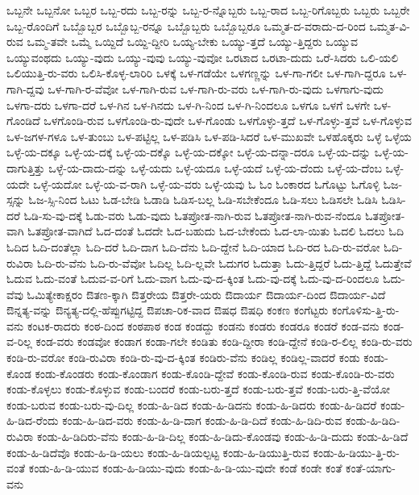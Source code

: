 {ಒಬ್ಬನೇ
ಒಬ್ಬನೋ
ಒಬ್ಬರ
ಒಬ್ಬ-ರದು
ಒಬ್ಬ-ರನ್ನು
ಒಬ್ಬ-ರ-ನ್ನೊಬ್ಬರು
ಒಬ್ಬ-ರಾದ
ಒಬ್ಬ-ರಿಗೊಬ್ಬರು
ಒಬ್ಬರು
ಒಬ್ಬರೇ
ಒಬ್ಬ-ರೊಂದಿಗೆ
ಒಬ್ಬೊಬ್ಬರ
ಒಬ್ಬೊಬ್ಬ-ರನ್ನೂ
ಒಬ್ಬೊಬ್ಬರು
ಒಬ್ಬೊಬ್ಬರೂ
ಒಮ್ಮತ-ದ-ವರಾದು-ದ-ರಿಂದ
ಒಮ್ಮತ-ವಿ-ರುವ
ಒಮ್ಮ-ತವೇ
ಒಮ್ಮೆ
ಒಯ್ದಿದೆ
ಒಯ್ದಿ-ದ್ದೀರಿ
ಒಯ್ಯ-ಬೇಕು
ಒಯ್ಯು-ತ್ತದೆ
ಒಯ್ಯು-ತ್ತಿದ್ದರು
ಒಯ್ಯುವ
ಒಯ್ಯುವಂಥದು
ಒಯ್ಯು-ವುದು
ಒಯ್ಯು-ವುವು
ಒಯ್ಯು-ವುವೋ
ಒರಟಾದ
ಒರಟಾ-ದುದು
ಒರೆ-ಸಿದರು
ಒಲಿ-ಯಲಿ
ಒಲಿಯುತ್ತಿ-ರು-ವರು
ಒಲಿಸಿ-ಕೊಳ್ಳ-ಲಾರಿರಿ
ಒಳಕ್ಕೆ
ಒಳ-ಗಡೆಯೇ
ಒಳಗಣ್ಣನ್ನು
ಒಳ-ಗಾ-ಗಲೀ
ಒಳ-ಗಾಗಿ-ದ್ದರೂ
ಒಳ-ಗಾಗಿ-ದ್ದವು
ಒಳ-ಗಾಗಿ-ರ-ವೆವೋ
ಒಳ-ಗಾಗಿ-ರುವ
ಒಳ-ಗಾಗಿ-ರು-ವರು
ಒಳ-ಗಾಗಿ-ರು-ವುದು
ಒಳಗಾಗು-ವುದು
ಒಳಗಾ-ದರು
ಒಳಗಾ-ದರೆ
ಒಳ-ಗಿನ
ಒಳ-ಗಿನದು
ಒಳ-ಗಿ-ನಿಂದ
ಒಳ-ಗಿ-ನಿಂದಲೂ
ಒಳಗೂ
ಒಳಗೆ
ಒಳಗೇ
ಒಳ-ಗೊಂಡಿದೆ
ಒಳಗೊಂಡಿ-ರುವ
ಒಳಗೊಂಡಿ-ರು-ವುದೇ
ಒಳ-ಗೊಂಡು
ಒಳಗೊಳ್ಳು-ತ್ತದೆ
ಒಳ-ಗೊಳ್ಳು-ತ್ತವೆ
ಒಳ-ಗೊಳ್ಳುವ
ಒಳ-ಜಗಳ-ಗಳೂ
ಒಳ-ತುಂಬು
ಒಳ-ಪಟ್ಟಿಲ್ಲ
ಒಳ-ಪಡಿಸಿ
ಒಳ-ಪಡಿ-ಸಿದರೆ
ಒಳ-ಮುಖವೇ
ಒಳಹೊಕ್ಕರು
ಒಳ್ಳೆ
ಒಳ್ಳೆಯ
ಒಳ್ಳೆ-ಯ-ದಕ್ಕೂ
ಒಳ್ಳೆ-ಯ-ದಕ್ಕೆ
ಒಳ್ಳೆ-ಯ-ದಕ್ಕೊ
ಒಳ್ಳೆ-ಯ-ದಕ್ಕೋ
ಒಳ್ಳೆ-ಯ-ದನ್ನಾ-ದರೂ
ಒಳ್ಳೆ-ಯ-ದನ್ನು
ಒಳ್ಳೆ-ಯ-ದಾಗುತ್ತಿತ್ತು
ಒಳ್ಳೆ-ಯ-ದಾದು-ದನ್ನು
ಒಳ್ಳೆ-ಯದು
ಒಳ್ಳೆ-ಯದೂ
ಒಳ್ಳೆ-ಯದೆ
ಒಳ್ಳೆ-ಯ-ದೆಂದು
ಒಳ್ಳೆ-ಯ-ದೆಂಬ
ಒಳ್ಳೆ-ಯದೇ
ಒಳ್ಳೆ-ಯದೋ
ಒಳ್ಳೆ-ಯ-ವ-ರಾಗಿ
ಒಳ್ಳೆ-ಯ-ವರು
ಒಳ್ಳೆ-ಯವು
ಓ
ಓಂ
ಓಂಕಾರದ
ಓಗೊಟ್ಟು
ಓಗೊಳ್ಳಿ
ಓಜ-ಸ್ಸನ್ನು
ಓಜ-ಸ್ಸಿ-ನಿಂದ
ಓಟು
ಓಡ-ಬೇಡಿ
ಓಡಾಡಿ
ಓಡಿಸ-ಬಲ್ಲ
ಓಡಿ-ಸಬೇಕೆಂದೂ
ಓಡಿ-ಸಲು
ಓಡಿಸಲೇ
ಓಡಿಸಿ
ಓಡಿಸಿ-ದರೆ
ಓಡಿ-ಸು-ವು-ದಕ್ಕೆ
ಓಡು-ವರು
ಓಡು-ವುದು
ಓತಪ್ರೋತ-ನಾಗಿ-ರುವ
ಓತಪ್ರೋತ-ನಾಗಿ-ರುವ-ನೆಂದೂ
ಓತಪ್ರೋತ-ವಾಗಿ
ಓತಪ್ರೋತ-ವಾಗಿದೆ
ಓದ-ದಂತೆ
ಓದದೇ
ಓದ-ಬಹುದು
ಓದ-ಬೇಕೆಂದು
ಓದ-ಲಾ-ಯಿತು
ಓದಲಿ
ಓದಲು
ಓದಿ
ಓದಿದ
ಓದಿ-ದಂತೆಲ್ಲಾ
ಓದಿ-ದರೆ
ಓದಿ-ದಾಗ
ಓದಿ-ದೆನು
ಓದಿ-ದ್ದೇನೆ
ಓದಿ-ಯಾದ
ಓದಿ-ರದ
ಓದಿ-ರು-ವರೋ
ಓದಿ-ರುವಿರಾ
ಓದಿ-ರು-ವೆನು
ಓದಿ-ರು-ವೆವೋ
ಓದಿಲ್ಲ
ಓದಿ-ಲ್ಲವೇ
ಓದುಗರ
ಓದುತ್ತಾ
ಓದು-ತ್ತಿದ್ದರೆ
ಓದು-ತ್ತಿದ್ದೆ
ಓದುತ್ತೇವೆ
ಓದುವ
ಓದು-ವಂತೆ
ಓದುವ-ವ-ರಿಗೆ
ಓದು-ವಾಗ
ಓದು-ವು-ದ-ಕ್ಕಿಂತ
ಓದು-ವು-ದಕ್ಕೆ
ಓದು-ವು-ದ-ರಿಂದಲೂ
ಓದು-ವೆವು
ಓಮಿತ್ಯೇಕಾಕ್ಷರಂ
ಔತಣ-ಕ್ಕಾಗಿ
ಔತ್ತರೇಯ
ಔತ್ತರೇ-ಯರು
ಔದಾರ್ಯ
ಔದಾರ್ಯ-ದಿಂದ
ಔದಾರ್ಯ-ವಿದೆ
ಔನ್ನತ್ಯ-ವನ್ನು
ಔನ್ಯತ್ಯ-ದಲ್ಲಿ-ಹೆಪ್ಪುಗಟ್ಟಿದ್ದ
ಔಪಚಾ-ರಿಕ-ವಾದ
ಔಷಧ
ಔಷಧಿ
ಕಂಕಣ
ಕಂಗೆಟ್ಟರು
ಕಂಗೊಳಿಸು-ತ್ತಿ-ರು-ವನು
ಕಂಟಕ-ರಾದರು
ಕಂಠ-ದಿಂದ
ಕಂಠಪಾಠ
ಕಂಡ
ಕಂಡದ್ದು
ಕಂಡನು
ಕಂಡರು
ಕಂಡರೂ
ಕಂಡರೆ
ಕಂಡ-ವನು
ಕಂಡ-ವ-ರಿಲ್ಲ
ಕಂಡ-ವರು
ಕಂಡವೋ
ಕಂಡಾಗ
ಕಂಡಾ-ಗಲೇ
ಕಂಡಿತು
ಕಂಡಿ-ದ್ದೀರಾ
ಕಂಡಿ-ದ್ದೇನೆ
ಕಂಡಿ-ರ-ಲಿಲ್ಲ
ಕಂಡಿ-ರು-ವರು
ಕಂಡಿ-ರು-ವರೋ
ಕಂಡಿ-ರುವಿರಾ
ಕಂಡಿ-ರು-ವು-ದ-ಕ್ಕಿಂತ
ಕಂಡಿರು-ವೆನು
ಕಂಡಿಲ್ಲ
ಕಂಡಿಲ್ಲ-ವಾದರೆ
ಕಂಡು
ಕಂಡು-ಕೊಂಡ
ಕಂಡು-ಕೊಂಡರು
ಕಂಡು-ಕೊಂಡಾಗ
ಕಂಡು-ಕೊಂಡಿ-ದ್ದೇವೆ
ಕಂಡು-ಕೊಂಡಿ-ರುವ
ಕಂಡು-ಕೊಂಡಿ-ರು-ವರು
ಕಂಡು-ಕೊಳ್ಳಲು
ಕಂಡು-ಕೊಳ್ಳುವ
ಕಂಡು-ಬಂದರೆ
ಕಂಡು-ಬರು-ತ್ತದೆ
ಕಂಡು-ಬರು-ತ್ತವೆ
ಕಂಡು-ಬರು-ತ್ತಿ-ವೆಯೋ
ಕಂಡು-ಬರುವ
ಕಂಡು-ಬರು-ವು-ದಿಲ್ಲ
ಕಂಡು-ಹಿ-ಡಿದ
ಕಂಡು-ಹಿ-ಡಿದನು
ಕಂಡು-ಹಿ-ಡಿದರು
ಕಂಡು-ಹಿ-ಡಿದರೆ
ಕಂಡು-ಹಿ-ಡಿದ-ರೆಂದು
ಕಂಡು-ಹಿ-ಡಿದ-ವರು
ಕಂಡು-ಹಿ-ಡಿ-ದಾಗ
ಕಂಡು-ಹಿ-ಡಿ-ದಿದೆ
ಕಂಡು-ಹಿ-ಡಿದಿ-ರುವ
ಕಂಡು-ಹಿ-ಡಿದಿ-ರುವಿರಾ
ಕಂಡು-ಹಿ-ಡಿದಿರು-ವೆನು
ಕಂಡು-ಹಿ-ಡಿ-ದಿಲ್ಲ
ಕಂಡು-ಹಿ-ಡಿದು-ಕೊಂಡವು
ಕಂಡು-ಹಿ-ಡಿ-ದುದು
ಕಂಡು-ಹಿ-ಡಿದೆ
ಕಂಡು-ಹಿ-ಡಿದೆವೊ
ಕಂಡು-ಹಿ-ಡಿ-ಯಲು
ಕಂಡು-ಹಿ-ಡಿಯಲ್ಪಟ್ಟ
ಕಂಡು-ಹಿ-ಡಿಯುತ್ತಿ-ರುವ
ಕಂಡು-ಹಿ-ಡಿಯು-ತ್ತಿ-ರು-ವಂತೆ
ಕಂಡು-ಹಿ-ಡಿ-ಯುವ
ಕಂಡು-ಹಿ-ಡಿಯು-ವುದು
ಕಂಡು-ಹಿ-ಡಿ-ಯು-ವುದೇ
ಕಂಡೆ
ಕಂಡೇ
ಕಂತೆ
ಕಂತೆ-ಯಾಗು-ವನು
}
